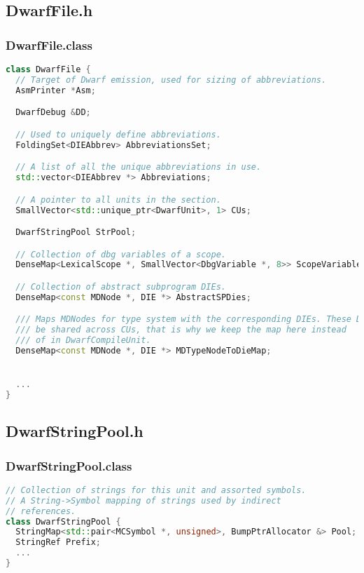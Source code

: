 \documentclass{ctexart}
\begin{document}
\subsection{DwarfFile.h}


\subsubsection{DwarfFile.class}
\begin{lstlisting}[language=C++]
class DwarfFile {
  // Target of Dwarf emission, used for sizing of abbreviations.
  AsmPrinter *Asm;

  DwarfDebug &DD;

  // Used to uniquely define abbreviations.
  FoldingSet<DIEAbbrev> AbbreviationsSet;

  // A list of all the unique abbreviations in use.
  std::vector<DIEAbbrev *> Abbreviations;

  // A pointer to all units in the section.
  SmallVector<std::unique_ptr<DwarfUnit>, 1> CUs;

  DwarfStringPool StrPool;

  // Collection of dbg variables of a scope.
  DenseMap<LexicalScope *, SmallVector<DbgVariable *, 8>> ScopeVariables;

  // Collection of abstract subprogram DIEs.
  DenseMap<const MDNode *, DIE *> AbstractSPDies;

  /// Maps MDNodes for type system with the corresponding DIEs. These DIEs can
  /// be shared across CUs, that is why we keep the map here instead
  /// of in DwarfCompileUnit.
  DenseMap<const MDNode *, DIE *> MDTypeNodeToDieMap;


  ...
}
\end{lstlisting}



\subsection{DwarfStringPool.h}

\subsubsection{DwarfStringPool.class}
\begin{lstlisting}[language=C++]
// Collection of strings for this unit and assorted symbols.
// A String->Symbol mapping of strings used by indirect
// references.
class DwarfStringPool {
  StringMap<std::pair<MCSymbol *, unsigned>, BumpPtrAllocator &> Pool;
  StringRef Prefix;
  ...
}
\end{lstlisting}
\end{document}
